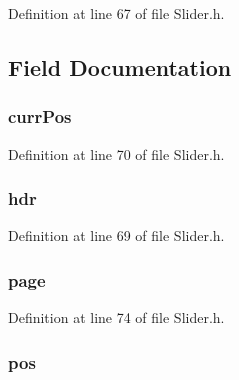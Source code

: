 Definition at line 67 of file Slider.\+h.



\subsection{Field Documentation}
\hypertarget{struct_s_l_i_d_e_r_a9633cf3738cc593dec6c4e03d03c94df}{}
\subsubsection[{curr\+Pos}]{ curr\+Pos}\label{struct_s_l_i_d_e_r_a9633cf3738cc593dec6c4e03d03c94df}


Definition at line 70 of file Slider.\+h.

\hypertarget{struct_s_l_i_d_e_r_abeffaf353197a8a64fba6707b68ce0be}{}
\subsubsection[{hdr}]{ hdr}\label{struct_s_l_i_d_e_r_abeffaf353197a8a64fba6707b68ce0be}


Definition at line 69 of file Slider.\+h.

\hypertarget{struct_s_l_i_d_e_r_aa30cf2ffa7e969cecf6c805e89e3dd43}{}
\subsubsection[{page}]{ page}\label{struct_s_l_i_d_e_r_aa30cf2ffa7e969cecf6c805e89e3dd43}


Definition at line 74 of file Slider.\+h.

\hypertarget{struct_s_l_i_d_e_r_a334282e8dc9fb36245b63e871c6ed478}{}
\subsubsection[{pos}]{ pos}\label{struct_s_l_i_d_e_r_a334282e8dc9fb36245b63e871c6ed478}


